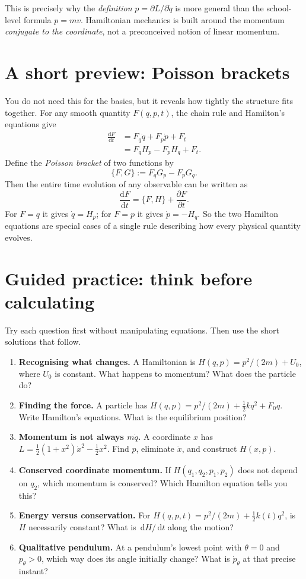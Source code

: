 \documentclass[11pt,a4paper,oneside]{article}
\newcommand{\dd}{\,\mathrm d}
\newcommand{\pd}[2]{\frac{\partial #1}{\partial #2}}
\newcommand{\dt}[1]{\frac{\mathrm d #1}{\mathrm d t}}
\begin{document}
This is precisely why the \emph{definition} $p=\partial L/\partial\dot q$ is more general than the school-level formula $p=mv$. Hamiltonian mechanics is built around the momentum \emph{conjugate to the coordinate}, not a preconceived notion of linear momentum.

\section{A short preview: Poisson brackets}
You do not need this for the basics, but it reveals how tightly the structure fits together. For any smooth quantity $F(q,p,t)$, the chain rule and Hamilton's equations give
\begin{align*}
 \dt F
 &=F_q\dot q+F_p\dot p+F_t\\
 &=F_qH_p-F_pH_q+F_t.
\end{align*}
Define the \emph{Poisson bracket} of two functions by
\[
 \{F,G\}:=F_qG_p-F_pG_q.
\]
Then the entire time evolution of any observable can be written as
\begin{equation}\label{eq:PB}
 \boxed{\dt F=\{F,H\}+\pd{F}{t}.}
\end{equation}
For $F=q$ it gives $\dot q=H_p$; for $F=p$ it gives $\dot p=-H_q$. So the two Hamilton equations are special cases of a single rule describing how every physical quantity evolves.

\section{Guided practice: think before calculating}
Try each question first without manipulating equations. Then use the short solutions that follow.

\begin{enumerate}[label=\textbf{\arabic*.}]
\item \textbf{Recognising what changes.} A Hamiltonian is $H(q,p)=p^2/(2m)+U_0$, where $U_0$ is constant. What happens to momentum? What does the particle do?
\item \textbf{Finding the force.} A particle has $H(q,p)=p^2/(2m)+\tfrac12kq^2+F_0q$. Write Hamilton's equations. What is the equilibrium position?
\item \textbf{Momentum is not always $m\dot q$.} A coordinate $x$ has $L=\tfrac12(1+x^2)\dot x^2-\tfrac12x^2$. Find $p$, eliminate $\dot x$, and construct $H(x,p)$.
\item \textbf{Conserved coordinate momentum.} If $H(q_1,q_2,p_1,p_2)$ does not depend on $q_2$, which momentum is conserved? Which Hamilton equation tells you this?
\item \textbf{Energy versus conservation.} For $H(q,p,t)=p^2/(2m)+\tfrac12k(t)q^2$, is $H$ necessarily constant? What is $\dd H/\dd t$ along the motion?
\item \textbf{Qualitative pendulum.} At a pendulum's lowest point with $\theta=0$ and $p_\theta>0$, which way does its angle initially change? What is $\dot p_\theta$ at that precise instant?
\end{enumerate}
\end{document}
